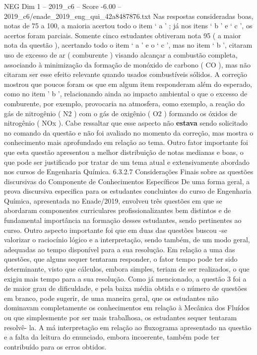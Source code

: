 \begin{textsample}{NEG Dim 1 – 2019\_c6 – Score -6.00 – 2019\_c6/enade\_2019\_eng\_qui\_42a8487876.txt}
Nas respostas consideradas boas, notas de 75 a 100, a maioria acertou todo o item ‘ a ’ ; já nos itens ‘ b ’ e ‘ c ’, os acertos foram parciais.
Somente cinco estudantes obtiveram nota 95 ( a maior nota da questão ), acertando todo o item ‘ a ’ e o ‘ c ’, mas no item ‘ b ’, citaram uso de excesso de ar ( comburente ) visando alcançar a combustão completa, associando à minimização da formação de monóxido de carbono ( CO ), mas não citaram ser esse efeito relevante quando usados combustíveis sólidos.
A correção mostrou que poucos foram os que em algum item responderam além do esperado, como no item ’ b ’, relacionando ainda ao impacto ambiental o que o excesso de comburente, por exemplo, provocaria na atmosfera, como exemplo, a reação do gás de nitrogênio ( N2 ) com o gás de oxigênio ( O2 ) formando os óxidos de nitrogênio ( NOx ).
Cabe ressaltar que esse aspecto não \textbf{estava} sendo solicitado no comando da questão e não foi avaliado no momento da correção, mas mostra o conhecimento mais aprofundado em relação ao tema.
Outro fator importante foi que esta questão apresentou a melhor distribuição de notas medianas e boas, o que pode ser justificado por tratar de um tema atual e extensivamente abordado nos cursos de Engenharia Química. 6.3.2.7 Considerações Finais sobre as questões discursivas do Componente de Conhecimentos Específicos De uma forma geral, a prova discursiva especifica para os estudantes concluintes do curso de Engenharia Química, apresentada no Enade/2019, envolveu três questões em que se abordaram componentes curriculares profissionalizantes bem distintos e de fundamental importância na formação desses estudantes, sendo pertinentes ao curso.
Outro aspecto importante foi que em duas das questões buscou -se valorizar o raciocínio lógico e a interpretação, sendo também, de um modo geral, adequadas ao tempo disponível para a sua resolução.
Em relação a uma das questões, que alguns sequer tentaram responder, o fator tempo pode ter sido determinante, visto que cálculos, embora simples, teriam de ser realizados, o que exigiu mais tempo para a sua resolução.
Como já mencionado, a questão 3 foi a de maior grau de dificuldade, e pela baixa média obtida e o número de questões em branco, pode sugerir, de uma maneira geral, que os estudantes não dominavam completamente os conhecimentos em relação à Mecânica dos Fluídos ou que simplesmente por ser mais trabalhosa, os estudantes sequer tentaram resolvê- la.
A má interpretação em relação ao fluxograma apresentado na questão e a falta da leitura do enunciado, embora incoerente, também pode ter contribuído para os erros obtidos.

\end{textsample}
